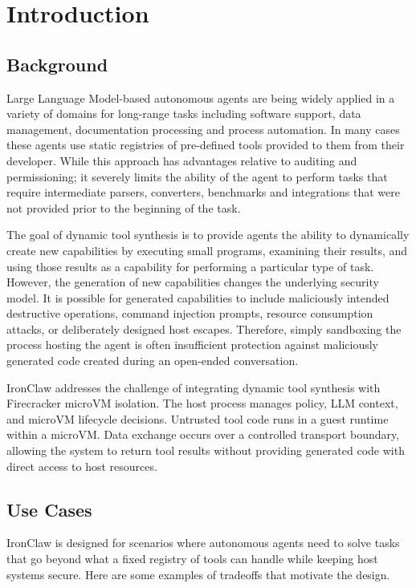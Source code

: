 
\chapter{Introduction}
\label{Chapter1}

\section{Background}
Large Language Model-based autonomous agents are being widely applied in a variety of domains for long-range tasks including software support, data management, documentation processing and process automation. In many cases these agents use static registries of pre-defined tools provided to them from their developer. While this approach has advantages relative to auditing and permissioning; it severely limits the ability of the agent to perform tasks that require intermediate parsers, converters, benchmarks and integrations that were not provided prior to the beginning of the task.

The goal of dynamic tool synthesis is to provide agents the ability to dynamically create new capabilities by executing small programs, examining their results, and using those results as a capability for performing a particular type of task. However, the generation of new capabilities changes the underlying security model. It is possible for generated capabilities to include maliciously intended destructive operations, command injection prompts, resource consumption attacks, or deliberately designed host escapes. Therefore, simply sandboxing the process hosting the agent is often insufficient protection against maliciously generated code created during an open-ended conversation.

IronClaw addresses the challenge of integrating dynamic tool synthesis with Firecracker microVM isolation. The host process manages policy, LLM context, and microVM lifecycle decisions. Untrusted tool code runs in a guest runtime within a microVM. Data exchange occurs over a controlled transport boundary, allowing the system to return tool results without providing generated code with direct access to host resources.

\section{Use Cases}
IronClaw is designed for scenarios where autonomous agents need to solve tasks
that go beyond what a fixed registry of tools can handle while keeping host
systems secure. Here are some examples of tradeoffs that motivate the design.


